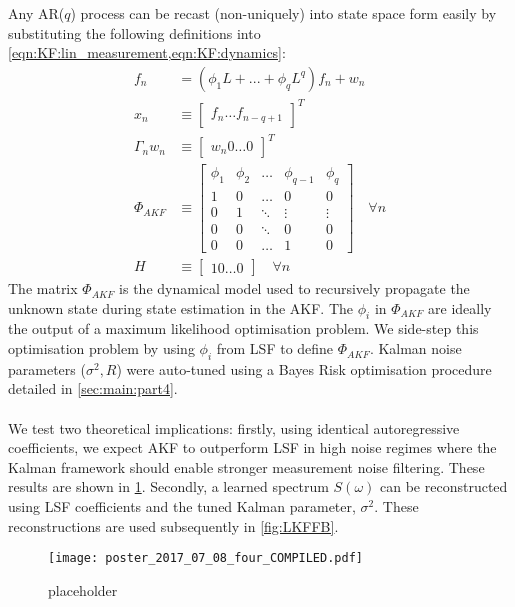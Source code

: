 \\
\\
Any AR($q$) process can be recast (non-uniquely) into state space form easily by substituting the following definitions into \cref{eqn:KF:lin_measurement,eqn:KF:dynamics}:
\begin{align}
f_n & = (\phi_1 L +  ... + \phi_q L^q) f_n + w_n \\
x_n & \equiv  \begin{bmatrix} f_{n} \hdots f_{n-q+1} \end{bmatrix}^T \\
\Gamma_n w_n & \equiv \begin{bmatrix} w_{n} 0 \hdots 0 \end{bmatrix}^T \\
\Phi_{AKF} & \equiv 
\begin{bmatrix}
\phi_1 & \phi_2 & \hdots & \phi_{q-1} & \phi_q \\ 
1 & 0 & \hdots & 0 & 0 \\  
0 & 1 & \ddots & \vdots & \vdots \\ 
0 & 0 & \ddots & 0 & 0 \\ 
0 & 0 & \hdots & 1 & 0 
\end{bmatrix} \quad \forall n \label{eqn:akf_Phi} \\
H & \equiv \begin{bmatrix} 1 0 \hdots 0 \end{bmatrix} \quad \forall n 
\end{align}
The matrix $\Phi_{AKF}$ is the dynamical model used to recursively propagate the unknown state during state estimation in the AKF. The ${\phi_i}$ in $\Phi_{AKF}$ are ideally the output of a maximum likelihood optimisation problem. We side-step this optimisation problem by using ${\phi_i}$ from LSF to define $\Phi_{AKF}$. Kalman noise parameters ($\sigma^2, R$) were auto-tuned using a Bayes Risk optimisation procedure detailed in \cref{sec:main:part4}.
\\
\\
We test two theoretical implications: firstly, using identical autoregressive coefficients, we expect  AKF to outperform LSF in high noise regimes where the Kalman framework should enable stronger measurement noise filtering. These results are shown in \cref{fig:LSFvAKF}. Secondly, a learned spectrum $S(\omega)$ can be reconstructed using LSF coefficients and the tuned Kalman parameter, $\sigma^2$. These reconstructions are used subsequently in \cref{fig:LKFFB}.
 \begin{figure}[h] 
 	\caption{placeholder}
	\texttt{[image: poster\_2017\_07\_08\_four\_COMPILED.pdf]}
	\label{fig:LSFvAKF}
\end{figure}

